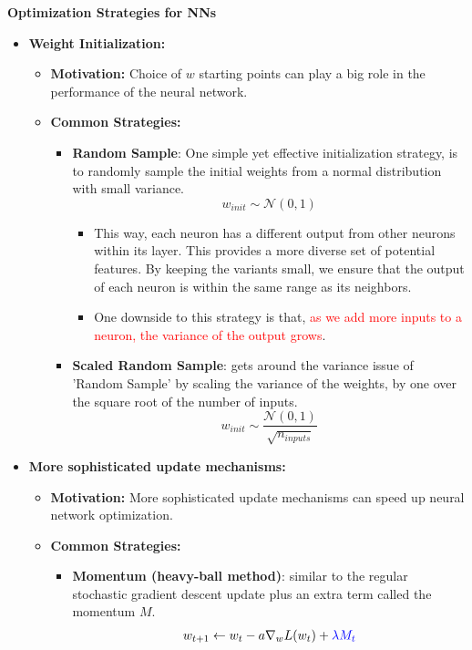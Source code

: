 \documentclass[12pt, a4paper]{article}
\begin{document}
\textbf{Optimization Strategies for NNs}
\begin{itemize}
  \item \textbf{Weight Initialization:}
  \begin{itemize}
    \item \textbf{Motivation:} Choice of $w$ starting points can play a big role in the performance of the neural network.
    \item \textbf{Common Strategies:}
    \begin{itemize}
      \item \textbf{Random Sample}: One simple yet effective initialization strategy, is to randomly sample the initial weights from a normal distribution with small variance.
      $$
      w_{init} \sim \mathcal{N}(0,1)
      $$
      \begin{itemize}
        \item This way, each neuron has a different output from other neurons within its layer. This provides a more diverse set of potential features. By keeping the variants small, we ensure that the output of each neuron is within the same range as its neighbors.
        \item One downside to this strategy is that, \textcolor{red}{as we add more inputs to a neuron, the variance of the output grows}.
      \end{itemize}
      \item \textbf{Scaled Random Sample}: gets around the variance issue of 'Random Sample' by scaling the variance of the weights, by one over the square root of the number of inputs.
      $$
      w_{init} \sim \frac{\mathcal{N}(0,1)}{\sqrt{n_{inputs}}}
      $$
    \end{itemize}
  \end{itemize}
  \item \textbf{More sophisticated update mechanisms:}
  \begin{itemize}
    \item \textbf{Motivation:} More sophisticated update mechanisms can speed up neural network optimization.
    \item \textbf{Common Strategies:}
    \begin{itemize}
      \item \textbf{Momentum (heavy-ball method)}: similar to the regular stochastic gradient descent update plus an extra term called the momentum $M$.
      \begin{gather}
        w_{t+1} \leftarrow w_t - a \nabla_w L(w_t) + \textcolor{blue}{\lambda M_t} \\

\end{gather}
\end{itemize}
\end{itemize}
\end{itemize}
\end{document}
